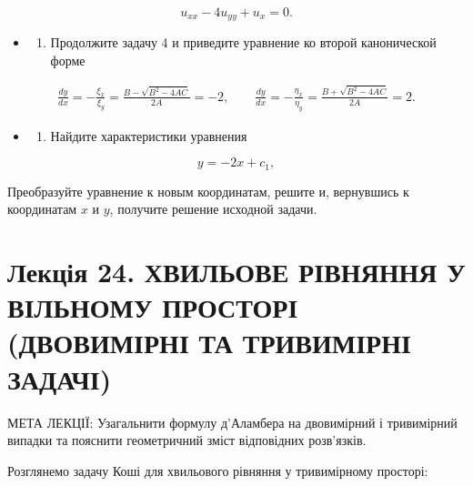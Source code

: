 \documentclass[
  ukrainian,
]{article}
\providecommand{\tightlist}{%
  \setlength{\itemsep}{0pt}\setlength{\parskip}{0pt}}
\begin{document}
\[
u_{xx} - 4u_{yy} + u_x = 0.
\]

\begin{itemize}
\tightlist
\item
  \begin{enumerate}
  \def\labelenumi{\arabic{enumi}.}
  \setcounter{enumi}{4}
  \tightlist
  \item
    Продолжите задачу 4 и приведите уравнение ко второй канонической
    форме
  \end{enumerate}
\end{itemize}

\[
\begin{aligned}
\frac{dy}{dx} = -\frac{\xi_x}{\xi_y} = \frac{B - \sqrt{B^2 - 4AC}}{2A} = -2, \qquad
\frac{dy}{dx} = -\frac{\eta_x}{\eta_y} = \frac{B + \sqrt{B^2 - 4AC}}{2A} = 2.
\end{aligned}
\]

\begin{itemize}
\tightlist
\item
  \begin{enumerate}
  \def\labelenumi{\arabic{enumi}.}
  \setcounter{enumi}{5}
  \tightlist
  \item
    Найдите характеристики уравнения
  \end{enumerate}
\end{itemize}

\[
y = -2x + c_1,
\]

Преобразуйте уравнение к новым координатам, решите и, вернувшись к
координатам \(x\) и \(y\), получите решение исходной задачи.

\section{Лекція 24. ХВИЛЬОВЕ РІВНЯННЯ У ВІЛЬНОМУ ПРОСТОРІ (ДВОВИМІРНІ ТА
ТРИВИМІРНІ
ЗАДАЧІ)}\label{ux43bux435ux43aux446ux456ux44f-24.-ux445ux432ux438ux43bux44cux43eux432ux435-ux440ux456ux432ux43dux44fux43dux43dux44f-ux443-ux432ux456ux43bux44cux43dux43eux43cux443-ux43fux440ux43eux441ux442ux43eux440ux456-ux434ux432ux43eux432ux438ux43cux456ux440ux43dux456-ux442ux430-ux442ux440ux438ux432ux438ux43cux456ux440ux43dux456-ux437ux430ux434ux430ux447ux456-1}

МЕТА ЛЕКЦІЇ: Узагальнити формулу д'Аламбера на двовимірний і тривимірний
випадки та пояснити геометричний зміст відповідних розв'язків.

Розглянемо задачу Коші для хвильового рівняння у тривимірному просторі:
\end{document}
